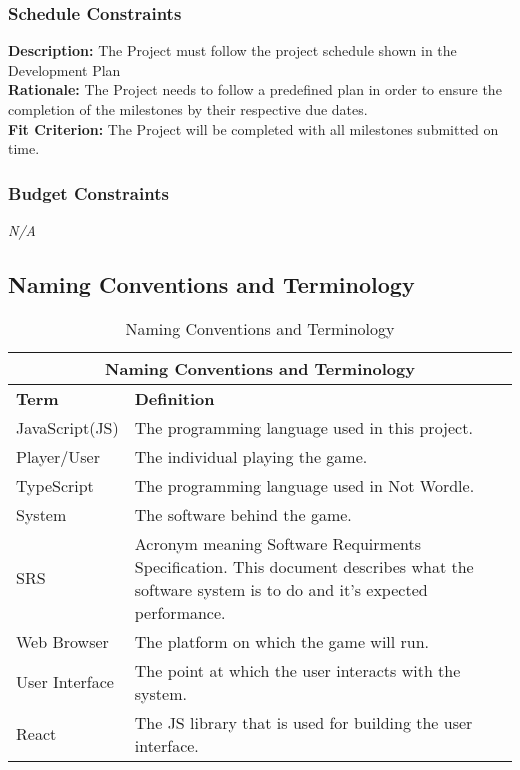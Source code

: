 \documentclass[12pt, titlepage]{article}
\begin{document}
\subsubsection{Schedule Constraints}
\noindent \textbf{Description:} The Project must follow the project schedule shown in the Development Plan\\
\textbf{Rationale:} The Project needs to follow a predefined plan in order to ensure the completion of the milestones by their respective due dates. \\
\textbf{Fit Criterion:} The Project will be completed with all milestones submitted on time. 

\subsubsection{Budget Constraints}
\noindent \emph{N/A}

\newpage
\subsection{Naming Conventions and Terminology}
\begin{table}[h!]
\caption{Naming Conventions and Terminology}
\begin{tabular}{ |p{6cm}|p{8cm}|  }
	\hline
	\multicolumn{2}{|c|}{Naming Conventions and Terminology} \\
	\hline
	\textbf{Term} & \textbf{Definition}\\
	\hline
	JavaScript(JS) & The programming language used in this project.  \\
	\hline
	Player/User & The individual playing the game.   \\
	\hline
	TypeScript & The programming language used in Not Wordle.  \\
	\hline
	System    & The software behind the game.  \\
	\hline 
	SRS & Acronym meaning Software Requirments Specification. This document 
	describes what the software system is to do and it's expected 
	performance.   \\
	\hline
	Web Browser & The platform on which the game will run. \\
	\hline
	User Interface & The point at which the user interacts with the 
	system.  \\
	\hline
	React & The JS library that is used for building the user interface.  \\
	\hline
\end{tabular}
\end{table}
\end{document}
